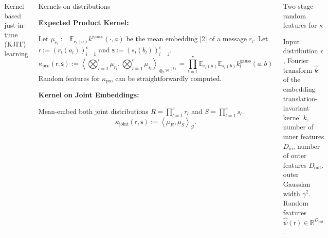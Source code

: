 \documentclass[english]{beamer}
\begin{document}
\begin{frame}
\begin{columns}[t]
\begin{block}{Kernel-based just-in-time (KJIT) learning }
\end{block}

\begin{block}{Kernels on distributions}

\textbf{Expected Product Kernel:} 

Let $\mu_{r_{l}}:=\mathbb{E}_{r_{l}(a)}k^{\text{gauss}}(\cdot,a)$
be the mean embedding [2] of a message $r_{l}$. 
Let $\mathsf{r}:=(r_{l}(a_{l}))_{l=1}^{c}$ and $\mathsf{s}:=(s_{l}(b_{l}))_{l=1}^{c}$.
\[
\kappa_{\text{pro}}\left(\mathsf{r},\mathsf{s}\right):=\left\langle \bigotimes_{l=1}^{c}\mu_{r_{l}},\bigotimes_{l=1}^{c}\mu_{s_{l}}\right\rangle _{\otimes_{l}\mathcal{H}^{(l)}}=\prod_{l=1}^{c}\mathbb{E}_{r_{l}(a)}\mathbb{E}_{s_{l}(b)}k_{l}^{\text{gauss}}\left(a,b\right)
\]
Random features for $\kappa_{\text{pro}}$ can be straightforwardly
computed. \vspace*{8mm}


\textbf{Kernel on Joint Embeddings: }

Mean-embed both joint distributions
$R=\prod_{l=1}^{c}r_{l}$ and $S=\prod_{l=1}^{c}s_{l}$. 
\[
\kappa_{\text{joint}}(\mathsf{r},\mathsf{s}):=\left\langle \mu_{R},\mu_{S}\right\rangle _{\mathcal{G}}.
\]
\end{block}

\begin{block}{Two-stage random features for $\kappa$}
\begin{algorithmic}[1]
\REQUIRE Input distribution $\mathsf{r}$, Fourier transform $\hat{k}$ of 
the embedding translation-invariant kernel $k$, number of inner features $D_\mathrm{in}$, number of outer features $D_\mathrm{out}$, outer Gaussian width $\gamma^2$.
\ENSURE Random features $\hat{\psi}(\mathsf{r}) \in \mathbb{R}^{D_\mathrm{out}}$. 


\end{algorithmic}
\end{block}
\end{columns}
\end{frame}
\end{document}
